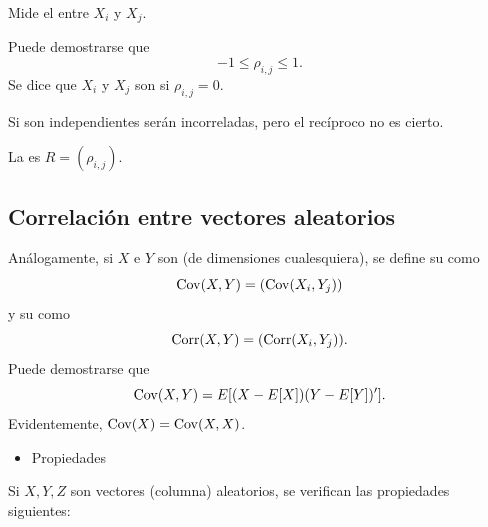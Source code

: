 Mide el  entre $X_i$ y $X_j$.

Puede demostrarse que \[ -1\le\rho_{i,j}\le1. \]
Se dice que $X_i$ y $X_j$ son  si $\rho_{i,j}=0$.

Si son independientes serán incorreladas, pero el recíproco no es cierto.

La  es $R=(\rho_{i,j})$.
\subsection{Correlación entre vectores aleatorios}
Análogamente, si $X$ e $Y$ son \veas (de dimensiones cualesquiera), se define su  como \[ \operatorname{Cov}(X,Y)=(\operatorname{Cov}(X_i,Y_j)) \] y su  como \[ \operatorname{Corr}(X,Y)=(\operatorname{Corr}(X_i,Y_j)). \]Puede demostrarse que \[ \operatorname{Cov}(X,Y)=E[(X-E[X])(Y-E[Y])']. \]Evidentemente, $\operatorname{Cov}(X)=\operatorname{Cov}(X,X)$.
\begin{itemize}[label=\color{red}\textbullet, leftmargin=*]
	\item \color{lightblue}Propiedades
\end{itemize}
Si $X,Y,Z$ son vectores (columna) aleatorios, se verifican las propiedades siguientes:

